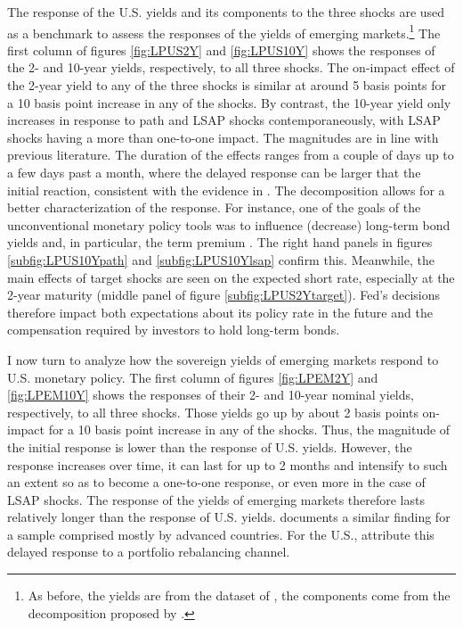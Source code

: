 {The response of the U.S. yields and its components to the three shocks are used as a benchmark to assess the responses of the yields of emerging markets.\footnote{ As before, the yields are from the dataset of \cite{GSW:2007}, the components come from the decomposition proposed by \cite{KimWright:2005}.}
The first column of figures \ref{fig:LPUS2Y} and \ref{fig:LPUS10Y} shows the responses of the 2- and 10-year yields, respectively, to all three shocks.
The on-impact effect of the 2-year yield to any of the three shocks is similar at around %
5 basis points for a 10 basis point increase in any of the shocks.
By contrast, the 10-year yield only increases in response to path and LSAP shocks contemporaneously, with LSAP shocks having a more than one-to-one impact.
The magnitudes are in line with previous literature.
The duration of the effects ranges from a couple of days up to a few days past a month, where the delayed response can be larger that the initial reaction, consistent with the evidence in \cite{BrooksKatzLustig:2019}.
The decomposition allows for a better characterization of the response.
For instance, one of the goals of the unconventional monetary policy tools was to influence (decrease) long-term bond yields and, in particular, the term premium \citep[see][]{Kuttner:2018}.
The right hand panels in figures \ref{subfig:LPUS10Ypath} and \ref{subfig:LPUS10Ylsap} confirm this.
Meanwhile, the main effects of target shocks are seen on the expected short rate, especially at the 2-year maturity (middle panel of figure \ref{subfig:LPUS2Ytarget}).
Fed's decisions therefore impact both expectations about its policy rate in the future and the compensation required by investors to hold long-term bonds.

I now turn to analyze how the sovereign yields of emerging markets respond to U.S. monetary policy.
The first column of figures \ref{fig:LPEM2Y} and \ref{fig:LPEM10Y} shows the responses of their 2- and 10-year nominal yields, respectively, to all three shocks.
Those yields go up by about 2 basis points on-impact for a 10 basis point increase in any of the shocks.
Thus, the magnitude of the initial response is lower than the response of U.S. yields.
However, the response increases over time, it can last for up to 2 months and intensify to such an extent so as to become a one-to-one response, or even more in the case of LSAP shocks.
The response of the yields of emerging markets therefore lasts relatively longer than the response of U.S. yields.
\cite{ACDM:2019} documents a similar finding for a sample comprised mostly by advanced countries.
For the U.S., \cite{BrooksKatzLustig:2019} attribute this delayed response to a portfolio rebalancing channel.

}
